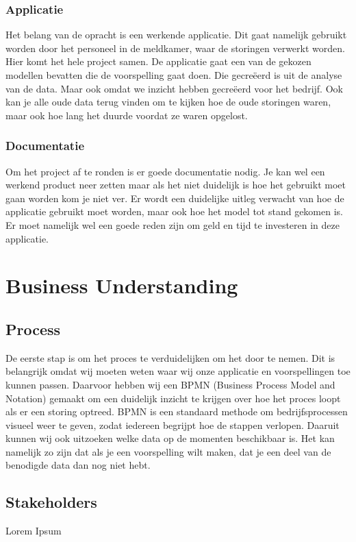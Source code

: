 \documentclass{article}
\begin{document}
\subsubsection{Applicatie}
Het belang van de opracht is een werkende applicatie. Dit gaat namelijk gebruikt worden door het personeel in de meldkamer, waar de storingen verwerkt worden. Hier komt het hele project samen. De applicatie gaat een van de gekozen modellen bevatten die de voorspelling gaat doen. Die gecreëerd is uit de analyse van de data. Maar ook omdat we inzicht hebben gecreëerd voor het bedrijf. Ook kan je alle oude data terug vinden om te kijken hoe de oude storingen waren, maar ook hoe lang het duurde voordat ze waren opgelost.

\subsubsection{Documentatie}
Om het project af te ronden is er goede documentatie nodig. Je kan wel een werkend product neer zetten maar als het niet duidelijk is hoe het gebruikt moet gaan worden kom je niet ver. Er wordt een duidelijke uitleg verwacht van hoe de applicatie gebruikt moet worden, maar ook hoe het model tot stand gekomen is. Er moet namelijk wel een goede reden zijn om geld en tijd te investeren in deze applicatie.
 
\newpage
\section{Business Understanding}

\subsection{Process}
De eerste stap is om het proces te verduidelijken om het door te nemen. Dit is belangrijk omdat wij moeten weten waar wij onze applicatie en voorspellingen toe kunnen passen. Daarvoor hebben wij een BPMN (Business Process Model and Notation) gemaakt om een duidelijk inzicht te krijgen over hoe het proces loopt als er een storing optreed. BPMN is een standaard methode om bedrijfsprocessen visueel weer te geven, zodat iedereen begrijpt hoe de stappen verlopen. Daaruit kunnen wij ook uitzoeken welke data op de momenten beschikbaar is. Het kan namelijk zo zijn dat als je een voorspelling wilt maken, dat je een deel van de benodigde data dan nog niet hebt.

\subsection{Stakeholders}
Lorem Ipsum
\end{document}
